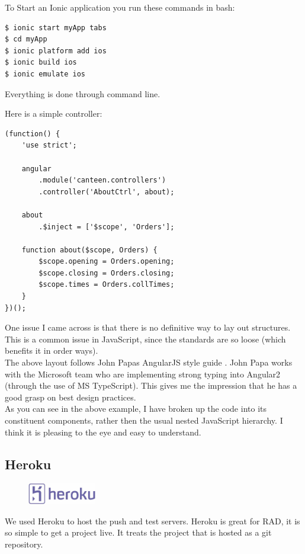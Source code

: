 To Start an Ionic application you run these commands in bash:
\begin{verbatim}
$ ionic start myApp tabs
$ cd myApp
$ ionic platform add ios
$ ionic build ios
$ ionic emulate ios
\end{verbatim}
Everything is done through command line.


\pagebreak
Here is a simple controller:
\begin{verbatim}
(function() {
    'use strict';

    angular
        .module('canteen.controllers')
        .controller('AboutCtrl', about);

    about
        .$inject = ['$scope', 'Orders'];

    function about($scope, Orders) {
        $scope.opening = Orders.opening;
        $scope.closing = Orders.closing;
        $scope.times = Orders.collTimes;
    }
})();
\end{verbatim}
One issue I came across is that there is no definitive way to lay out structures.
This is a common issue in JavaScript, since the standards are so loose (which benefits it in order ways).
\\

The above layout follows John Papas AngularJS style guide \cite{angular_style_guide}.
John Papa works with the Microsoft team who are implementing strong typing into Angular2 (through the use of MS TypeScript).
This gives me the impression that he has a good grasp on best design practices.
\\

As you can see in the above example, I have broken up the code into its constituent components, rather then the usual nested JavaScript hierarchy.
I think it is pleasing to the eye and easy to understand.

\subsection{Heroku}
\begin{figure}
	\includegraphics[width=3cm]{img/mobile-app/logos/heroku.jpg}
\end{figure} 
We used Heroku \cite{heroku} to host the push and test servers.
Heroku is great for RAD, it is so simple to get a project live.
It treats the project that is hosted as a git repository.

